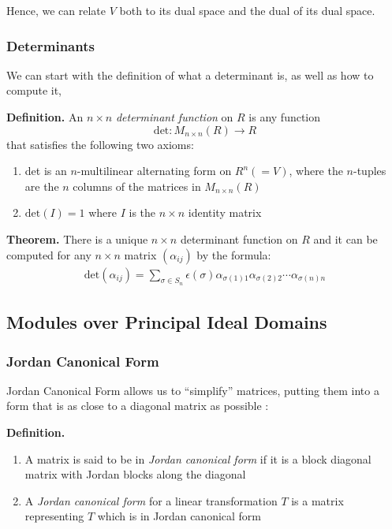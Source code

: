 \documentclass[11pt, reqno]{amsart}
\theoremstyle{plain}
\theoremstyle{definition}
\theoremstyle{example}
\begin{document}
\par
Hence, we can relate $V$ both to its dual space and the dual of its dual space.

\subsubsection{Determinants}

We can start with the definition of what a determinant is, as well as how to compute it,

\par
\textbf{Definition.} An $n \times n$ \textit{determinant function} on $R$ is any function $$\text{det}: M_{n \times n}(R) \to R$$that satisfies the following two axioms:
\begin{enumerate}
\item det is an $n$-multilinear alternating form on $R^n (= V)$, where the $n$-tuples are the $n$ columns of the matrices in $M_{n \times n}(R)$
\item $\text{det}(I) = 1$ where $I$ is the $n \times n$ identity matrix
\end{enumerate}

\par
\textbf{Theorem.} There is a unique $n \times n$ determinant function on $R$ and it can be computed for any $n \times n$ matrix $(\alpha_{ij})$ by the formula:
\begin{align*}
\text{det}(\alpha_{ij}) = \sum_{\sigma \in S_n} \epsilon(\sigma) \alpha_{\sigma(1)1}\alpha_{\sigma(2)2}\cdots \alpha_{\sigma(n)n}
\end{align*}



\subsection{Modules over Principal Ideal Domains}

\subsubsection{Jordan Canonical Form}

Jordan Canonical Form allows us to ``simplify'' matrices, putting them into a form that is as close to a diagonal matrix as possible \cite[\S 11.3, p. 431]{dummit}:

\par
\textbf{Definition.}
\begin{enumerate}
\item A matrix is said to be in \textit{Jordan canonical form} if it is a block diagonal matrix with Jordan blocks along the diagonal
\item A \textit{Jordan canonical form} for a linear transformation $T$ is a matrix representing $T$ which is in Jordan canonical form
\end{enumerate}
\end{document}
